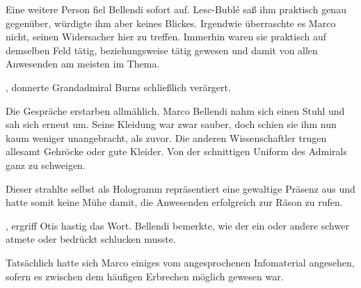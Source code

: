Eine weitere Person fiel Bellendi sofort auf. Lesc-Bublé saß ihm praktisch genau gegenüber, würdigte ihm aber keines Blickes. Irgendwie überraschte es Marco nicht, seinen Widersacher hier zu treffen. Immerhin waren sie praktisch auf demselben Feld tätig, beziehungsweise tätig gewesen und damit von allen Anwesenden am meisten im Thema.

\par

, donnerte Grandadmiral Burns schließlich verärgert. 

\par

Die Gespräche erstarben allmählich. Marco Bellendi nahm sich einen Stuhl und sah sich erneut um. Seine Kleidung war zwar sauber, doch schien sie ihm nun kaum weniger unangebracht, als zuvor. Die anderen Wissenschaftler trugen allesamt Gehröcke oder gute Kleider. Von der schnittigen Uniform des Admirals ganz zu schweigen.

\par

Dieser strahlte selbst als Hologramm repräsentiert eine gewaltige Präsenz aus und hatte somit keine Mühe damit, die Anwesenden erfolgreich zur Räson zu rufen.

\par

, ergriff Otis hastig das Wort.  Bellendi bemerkte, wie der ein oder andere schwer atmete oder bedrückt schlucken musste. 

\par

Tatsächlich hatte sich Marco einiges vom angesprochenen Infomaterial angesehen, sofern es zwischen dem häufigen Erbrechen möglich gewesen war.

\par

